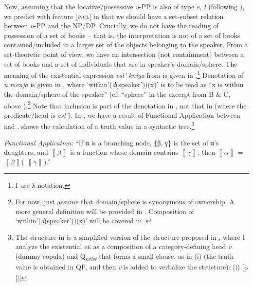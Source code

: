 \documentclass[output=paper,colorlinks,citecolor=brown,modfonts,nonflat]{langsci/langscibook}
\begin{document}
Now, assuming that the locative/possessive \textit{u}{}-PP is also of type {\textlangle}\textit{e}, \textit{t}{\textrangle} (following \citealt[65]{HeimKratzer1998}), we predict with feature [\textsc{incl}] in  that we should have a set-subset relation between \textit{u}{}-PP and the NP/DP. Crucially, we do not have the reading of possession of a set of books – that is, the interpretation is not of a set of books contained/included in a larger set of the objects belonging to the speaker. From a set-theoretic point of view, we have an intersection (not containment) between a set of books and a set of individuals that are in speaker’s domain/sphere. The meaning of the existential expression \textit{est’ kniga} from  is given in .\footnote{I use  λ-notation.} Denotation of \textit{u menja} is given in , where ‘within'(\textit{d}(speaker'))(x)’ is to be read as “x is within the domain/sphere of the speaker” (cf. “sphere” in the excerpt from B \& C, above ).\footnote{For now, just assume that domain/sphere is synonymous of ownership. A more general definition will be provided in . Composition of ‘within\textrm{'}(\textit{d}(speaker\textrm{'}))(x)’ will be covered in .}  Note that inclusion is part of the denotation in , not that in  (where the predicate/head is \textit{est’}). In , we have a result of Functional Application between  and .  shows the calculation of a truth value in a syntactic tree.\footnote{The structure in  is a simplified version of the structure proposed in \citet{TsedrykInPress}, where I analyze the existential \textsc{be} as a composition of a category-defining head \textit{v} (dummy copula) and Q\textit{\textsubscript{exist}} that forms a small clause, as in (i) (the truth value is obtained in QP, and then \textit{v} is added to verbalize the structure):   (i)  [\textsubscript{\liv P} \liv [\textsubscript{QP} PP [\textsubscript{QP} \textit{est’} [\textsubscript{NP} \textit{kniga}]]]]} 

\ea%
    \label{ex:tsedryk:10}
    \textit{Functional Application}: “If α is a branching node, \{β, γ\} is the set of α’s daughters, and  $\left\llbracket \beta \right\rrbracket $  is a function whose domain contains  $\left\llbracket \gamma \right\rrbracket $, then  $\left\llbracket \alpha \right\rrbracket $ =  $\left\llbracket \beta \right\rrbracket $( $\left\llbracket \gamma \right\rrbracket $).” \hfill \citep[44]{HeimKratzer1998}
    \z
\end{document}
